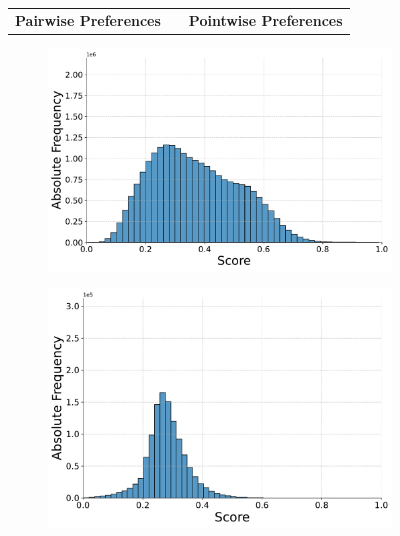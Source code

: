 \begin{figure}[t]
    \centering
    \begin{tabular}{ccc}
        \textbf{Pairwise Preferences} & \hspace{2cm} & \textbf{Pointwise Preferences} \\
    \end{tabular}
    \footnotesize
    \begin{subfigure}[b]{0.49\textwidth}
        \centering
        \includegraphics[width=\textwidth]{graphics/evaluation/pairwise_score_distribution_flan-t5-base.pdf}
        \label{fig:pairwise_flan-t5-base}
    \end{subfigure}
    \hfill
    \begin{subfigure}[b]{0.49\textwidth}
        \centering
        \includegraphics[width=\textwidth]{graphics/evaluation/pointwise_score_distribution_flan-t5-base.pdf}
        \label{fig:pointwise_flan-t5-base}
    \end{subfigure}


\end{figure}
